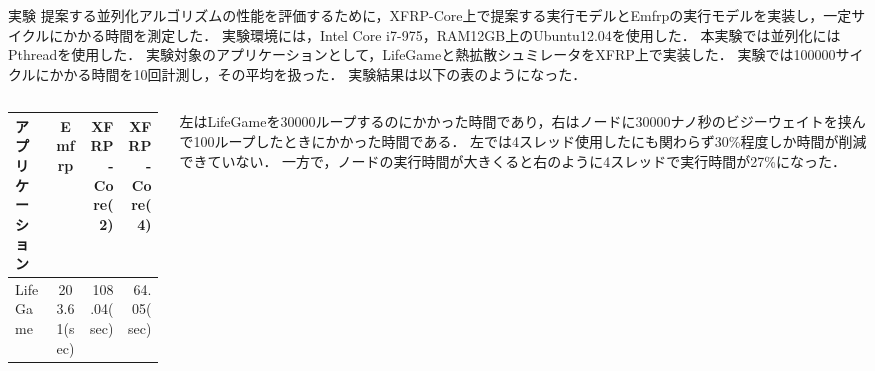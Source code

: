 \documentclass[dvipdfmx,final,t,10pt]{beamer}
\begin{document}
\begin{frame}[fragile]
    \begin{block}{実験}
        \vskip 0.2cm
            提案する並列化アルゴリズムの性能を評価するために，XFRP-Core上で提案する実行モデルとEmfrpの実行モデルを実装し，一定サイクルにかかる時間を測定した．
            実験環境には，Intel Core i7-975，RAM12GB上のUbuntu12.04を使用した．
            本実験では並列化にはPthreadを使用した．
            実験対象のアプリケーションとして，LifeGameと熱拡散シュミレータをXFRP上で実装した．
            実験では100000サイクルにかかる時間を10回計測し，その平均を扱った．
            実験結果は以下の表のようになった．
        \begin{columns}
            \begin{column}{0.5\textwidth}
                \begin{table}
                    \begin{tabular}{|l|c|r|r|} \hline
                        アプリケーション & Emfrp & XFRP-Core(2) & XFRP-Core(4) \\ \hline
                        LifeGame & 203.61(sec) & 108.04(sec) & 64.05(sec) \\ \hline
                    \end{tabular}
                \end{table}
            \end{column}
            \begin{column}{0.4\textwidth}
                左はLifeGameを30000ループするのにかかった時間であり，右はノードに30000ナノ秒のビジーウェイトを挟んで100ループしたときにかかった時間である．
                左では4スレッド使用したにも関わらず30\%程度しか時間が削減できていない．
                一方で，ノードの実行時間が大きくると右のように4スレッドで実行時間が27\%になった．
            \end{column}
        \end{columns}
    \end{block}
\end{frame}
\end{document}
